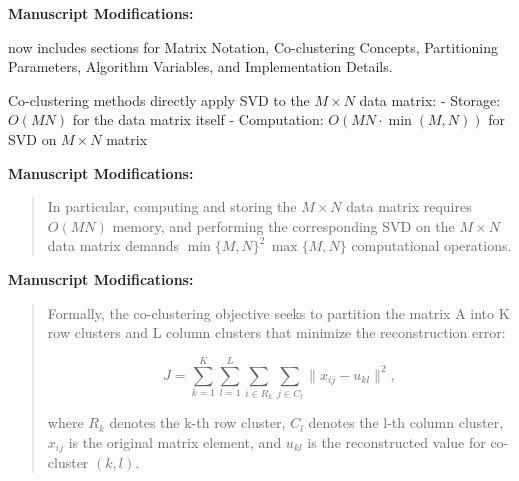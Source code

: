 \documentclass{ar2rc}
\theoremstyle{definition}
\theoremstyle{remark} %
\begin{document}
\textbf{Manuscript Modifications:}

 now includes sections for Matrix Notation, Co-clustering Concepts, Partitioning Parameters, Algorithm Variables, and Implementation Details.



Co-clustering methods directly apply SVD to the $M \times N$ data matrix:
- Storage: $O(MN)$ for the data matrix itself
- Computation: $O(MN \cdot \min(M,N))$ for SVD on $M \times N$ matrix

\textbf{Manuscript Modifications:}

\begin{quote}
  In particular, computing and storing the $M \times N$ data matrix requires $O(MN)$ memory, and performing the corresponding SVD on the $M \times N$ data matrix demands $\min\{M,N\}^2\,\max\{M,N\}$ computational operations.
\end{quote}




\textbf{Manuscript Modifications:}

\begin{quote}
  Formally, the co-clustering objective seeks to partition the matrix A into K row clusters and L column clusters that minimize the reconstruction error:

  \begin{equation}
    J = \sum_{k=1}^{K} \sum_{l=1}^{L} \sum_{i \in R_k} \sum_{j \in C_l} \| x_{ij} - u_{kl} \|^2,
  \end{equation}

  where $R_k$ denotes the k-th row cluster, $C_l$ denotes the l-th column cluster, $x_{ij}$ is the original matrix element, and $u_{kl}$ is the reconstructed value for co-cluster $(k,l)$.
\end{quote}
\end{document}
